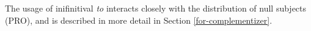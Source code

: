 
The usage of inifinitival {\em to} interacts closely with the
distribution of null subjects (PRO), and is described in more detail
in Section \ref{for-complementizer}.






